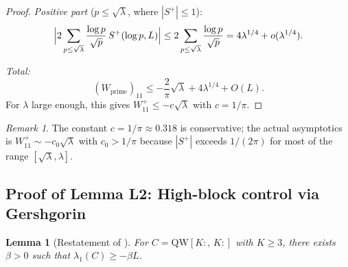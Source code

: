\documentclass[12pt,a4paper]{article}
\newtheorem{lemma}[theorem]{Lemma}
\theoremstyle{definition}
\theoremstyle{remark}
\newtheorem{remark}[theorem]{Remark}
\begin{document}
\begin{proof}
\emph{Positive part} ($p \leq \sqrt{\lambda}$, where $|S^+| \leq 1$):
\[
  \Bigl|2\sum_{p \leq \sqrt{\lambda}}\frac{\log p}{\sqrt{p}}\,S^+(\log p, L)\Bigr|
  \leq 2\sum_{p \leq \sqrt{\lambda}}\frac{\log p}{\sqrt{p}} = 4\lambda^{1/4} + o(\lambda^{1/4}).
\]

\emph{Total:}
\[
  (W_{\mathrm{prime}})_{11} \leq -\frac{2}{\pi}\sqrt{\lambda} + 4\lambda^{1/4} + O(L).
\]
For $\lambda$ large enough, this gives $W_{11}^+ \leq -c\sqrt{\lambda}$ with $c = 1/\pi$.
\end{proof}

\begin{remark}
The constant $c = 1/\pi \approx 0.318$ is conservative; the actual asymptotics is $W_{11}^+ \sim -c_0\sqrt{\lambda}$ with $c_0 > 1/\pi$ because $|S^+|$ exceeds $1/(2\pi)$ for most of the range $[\sqrt{\lambda}, \lambda]$.
\end{remark}

\subsection{Proof of Lemma L2: High-block control via Gershgorin}

\begin{lemma}[Restatement of ]
For $C = \mathrm{QW}[K{:},\,K{:}]$ with $K \geq 3$, there exists $\beta > 0$ such that $\lambda_1(C) \geq -\beta L$.
\end{lemma}
\end{document}
